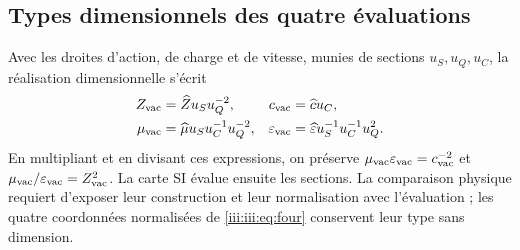 \subsection{Types dimensionnels des quatre évaluations}

Avec les droites d’action, de charge et de vitesse, munies de sections
$u_S,u_Q,u_C$, la réalisation dimensionnelle s’écrit
\begin{align}
 Z_{\rm vac}&=\widehat Z u_Su_Q^{-2},&
 c_{\rm vac}&=\widehat c u_C,\\
 \mu_{\rm vac}&=\widehat\mu u_Su_C^{-1}u_Q^{-2},&
 \varepsilon_{\rm vac}&=\widehat\varepsilon u_S^{-1}u_C^{-1}u_Q^2.
 \label{iii:iii:eq:dimensions}
\end{align}
En multipliant et en divisant ces expressions, on préserve $\mu_{\rm vac}\varepsilon_{\rm vac}=c_{\rm vac}^{-2}$ et $\mu_{\rm vac}/\varepsilon_{\rm vac}=Z_{\rm vac}^2$. La carte SI évalue ensuite les sections. La comparaison physique requiert d'exposer leur construction et leur normalisation avec l'évaluation ; les quatre coordonnées normalisées de \eqref{iii:iii:eq:four} conservent leur type sans dimension.
